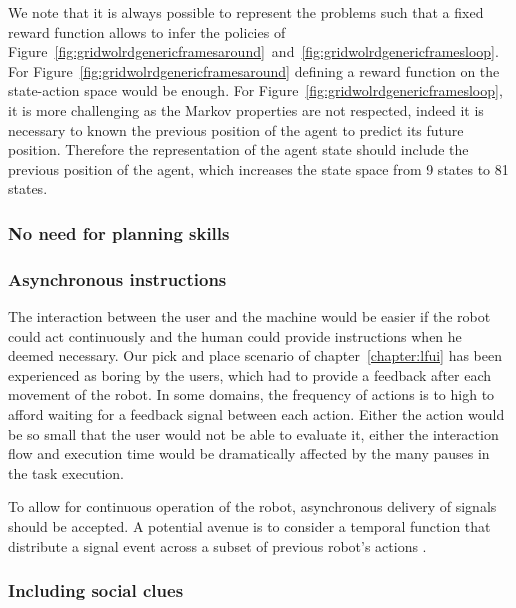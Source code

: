 We note that it is always possible to represent the problems such that a fixed reward function allows to infer the policies of Figure~\ref{fig:gridwolrdgenericframesaround}~and~\ref{fig:gridwolrdgenericframesloop}. For Figure~\ref{fig:gridwolrdgenericframesaround} defining a reward function on the state-action space would be enough. For Figure~\ref{fig:gridwolrdgenericframesloop}, it is more challenging as the Markov properties are not respected, indeed it is necessary to known the previous position of the agent to predict its future position. Therefore the representation of the agent state should include the previous position of the agent, which increases the state space from 9 states to 81 states.

\subsubsection*{No need for planning skills}



\subsubsection*{Asynchronous instructions}

The interaction between the user and the machine would be easier if the robot could act continuously and the human could provide instructions when he deemed necessary. Our pick and place scenario of chapter~\ref{chapter:lfui} has been experienced as boring by the users, which had to provide a feedback after each movement of the robot. In some domains, the frequency of actions is to high to afford waiting for a feedback signal between each action. Either the action would be so small that the user would not be able to evaluate it, either the interaction flow and execution time would be dramatically affected by the many pauses in the task execution.

To allow for continuous operation of the robot, asynchronous delivery of signals should be accepted. A potential avenue is to consider a temporal function that distribute a signal event across a subset of previous robot's actions \cite{hockley1984analysis,knox2009interactively}. 


\subsubsection*{Including social clues}

